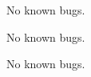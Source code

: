 
\begin{DoxyRefList}
\item[\label{bug__bug000001}%
\hypertarget{bug__bug000001}{}%
File \hyperlink{main_8c}{main.c} ]No known bugs. 

No known bugs. 

No known bugs. 
\end{DoxyRefList}
